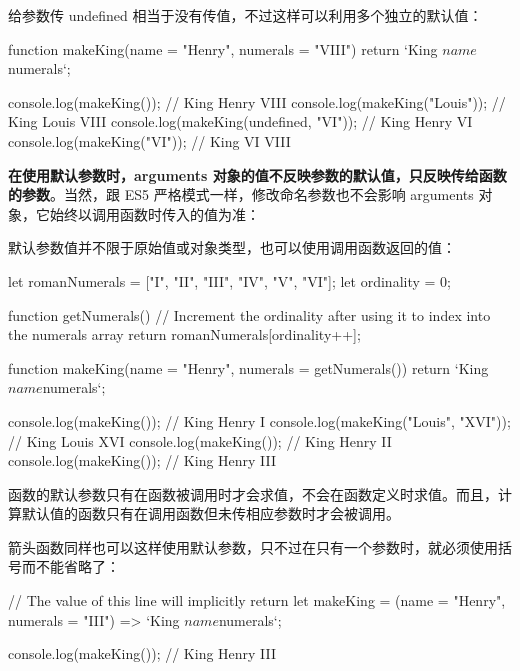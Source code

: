 给参数传 undefined 相当于没有传值，不过这样可以利用多个独立的默认值：
\begin{js}
function makeKing(name = "Henry", numerals = "VIII") {
  return `King ${name} ${numerals}`;
}

console.log(makeKing()); // King Henry VIII
console.log(makeKing("Louis")); // King Louis VIII
console.log(makeKing(undefined, "VI")); // King Henry VI
console.log(makeKing("VI")); // King VI VIII
\end{js}

\textbf{在使用默认参数时，arguments 对象的值不反映参数的默认值，只反映传给函数的参数}。当然，跟 ES5 严格模式一样，修改命名参数也不会影响 arguments 对象，它始终以调用函数时传入的值为准：

默认参数值并不限于原始值或对象类型，也可以使用调用函数返回的值：
\begin{js}
let romanNumerals = ["I", "II", "III", "IV", "V", "VI"];
let ordinality = 0;

function getNumerals() {
  // Increment the ordinality after using it to index into the numerals array
  return romanNumerals[ordinality++];
}

function makeKing(name = "Henry", numerals = getNumerals()) {
  return `King ${name} ${numerals}`;
}

console.log(makeKing()); // King Henry I
console.log(makeKing("Louis", "XVI")); // King Louis XVI
console.log(makeKing()); // King Henry II
console.log(makeKing()); // King Henry III
\end{js}

函数的默认参数只有在函数被调用时才会求值，不会在函数定义时求值。而且，计算默认值的函数只有在调用函数但未传相应参数时才会被调用。

箭头函数同样也可以这样使用默认参数，只不过在只有一个参数时，就必须使用括号而不能省略了：
\begin{js}
// The value of this line will implicitly return
let makeKing = (name = "Henry", numerals = "III") => `King ${name} ${numerals}`;

console.log(makeKing()); // King Henry III
\end{js}

